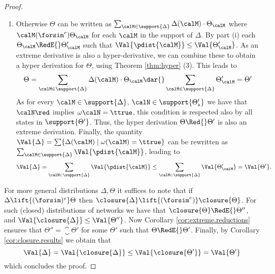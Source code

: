 \documentclass{LMCS}
\begin{document}
\begin{proof}
\begin{enumerate}[label=(\roman*)]
\item
Otherwise $\Theta$ can be written as 
\begin{math}
  \sum_{\calM \in \support{\Delta}} \Delta(\calM) \cdot \Theta_{\calM}
\end{math}
where $\calM (\forsim^e) \Theta_{\calM}$ for each ${\calM}$ in the support of $\Delta$. 
By part (i) each $\Theta_{\calM} \RedE{} \Theta'_{\calM}$ such that $\Val{\pdist{\calM}} 
\leq \Val{\Theta'_{\calM}}$.
As an extreme derivative is also a hyper-derivative, we can combine these to obtain a hyper 
derivation for $\Theta$, using Theorem \ref{thm:hyper} (3). This leads to 
\[
\Theta = \sum_{\calM \in \support{\Delta}} \Delta(\calM) \cdot \Theta_{\calM} \dar{} 
 \sum_{\calM \in \support{\Delta}} \Theta'_{\calM} = \Theta'
\]
As for every $\calM \in \support{\Delta}$, $\calN \in \support{\Theta'_s}$ we have that 
$\calN \red$ implies $\omega{\calN} = \ttrue$, this condition is respected 
also by all states in $\support{\Theta'}$. Thus, the hyper derivation 
$\Theta \Red{} \Theta'$ is also an extreme derivation. 
Finally, the quantity $\Val{\Delta} = \sum \{ \Delta(\calM)\;|\; \omega(\calM) = \ttrue\}$ 
can be rewritten as $\sum_{\calM \in \support{\Delta}} \Val{\pdist{\calM}}$, leading to 
\[
 \Val{\Delta} = \sum_{\calM \in \support{\Delta}} \Val{\pdist{\calM}} \leq 
 \sum_{\calM \in \support{\Delta}} \Val{\Theta'_{\calM}} = \Val{\Theta'}.
\]
 
  \end{enumerate}
  
\noindent For more general distributions $\Delta, \Theta$ it suffices to note 
that if $\Delta \lift{(\forsim)^e} \Theta$ then $\closure{\Delta} 
\lift{(\forsim^e)} \closure{\Theta}$. For such (closed) distributions 
of networks we have that $\closure{\Theta} \RedE{} \Theta''$, 
and $\Val{\closure{\Delta}} \leq \Val{\Theta''}$. Now Corollary 
\ref{cor:extreme.reductions} ensures that $\Theta'' = \closure{\Theta'}$ 
for some $\Theta'$ such that $\Theta \RedE{} \Theta'$. 
Finally, by Corollary \ref{cor:closure.results} we obtain that 
\[
\Val{\Delta} = \Val{\closure{\Delta}} \leq \Val{\closure{\Theta'}} = \Val{\Theta'}
\]
which concludes the proof.
\end{proof}
\end{document}
